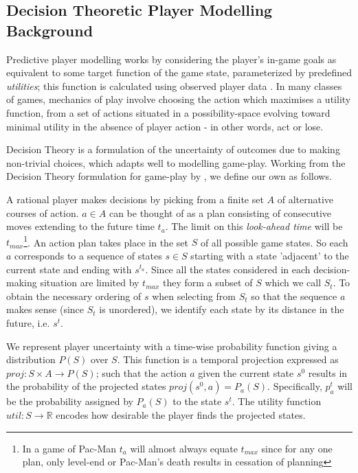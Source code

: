 \documentclass[conference]{IEEEtran}
\begin{document}
\subsection{Decision Theoretic Player Modelling Background}
\label{dtpm}
Predictive player modelling works by considering the player's in-game goals as equivalent to some target function of the game state, parameterized by predefined \textit{utilities}; this function is calculated using observed player data \cite{Thue2006}. In many classes of games, mechanics of play involve choosing the action which maximises a utility function, from a set of actions situated in a possibility-space evolving toward minimal utility in the absence of player action - in other words, act or lose.

Decision Theory \cite{Curley1989} is a formulation of the uncertainty of outcomes due to making non-trivial choices, which adapts well to modelling game-play. Working from the Decision Theory formulation for game-play by \cite{Gmytrasiewicz2000}, we define our own as follows.

A rational player makes decisions by picking from a finite set $A$ of alternative courses of action. $a \in A$ can be thought of as a plan consisting of consecutive moves extending to the future time $t_a$. The limit on this \textit{look-ahead time} will be $t_{max}$\footnote{In a game of Pac-Man $t_a$ will almost always equate $t_{max}$ since for any one plan, only level-end or Pac-Man's death results in cessation of planning}. An action plan takes place in the set $S$ of all possible game states. So each $a$ corresponds to a sequence of states $s \in S$ starting with a state 'adjacent' to the current state and ending with $s^{t_a}$. Since all the states considered in each decision-making situation are limited by $t_{max}$ they form a subset of $S$ which we call $S_t$. To obtain the necessary ordering of $s$ when selecting from $S_t$ so that the sequence $a$ makes sense (since $S_t$ is unordered), we identify each state by its distance in the future, i.e. $s^t$.

We represent player uncertainty with a time-wise probability function giving a distribution $P(S)$ over $S$. This function is a temporal projection expressed as $proj:S \times A \to P(S)$; such that the action $a$ given the current state $s^0$ results in the probability of the projected states $proj(s^0,a)=P_a (S)$. Specifically, $p_a^t$ will be the probability assigned by $P_a (S)$ to the state $s^t$. The utility function $util:S \to \mathbb{R}$ encodes how desirable the player finds the projected states.
\end{document}
